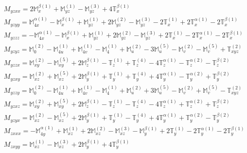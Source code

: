 \documentclass[fleqn,8pt,landscape]{jsarticle}
\begin{document}
\begin{align*}
& M_{yzxx} = 2 \mathbb{M}_{x}^{\beta(1)} + \mathbb{M}_{yz}^{(1)} - \mathbb{M}_{yz}^{(3)} + 4 \mathbb{T}_{x}^{\beta(1)} \\
& M_{yzyy} = \mathbb{M}_{4x}^{\alpha(1)} - \mathbb{M}_{x}^{\beta(1)} + \mathbb{M}_{yz}^{(1)} + 2 \mathbb{M}_{yz}^{(2)} - \mathbb{M}_{yz}^{(3)} - 2 \mathbb{T}_{x}^{(1)} + 2 \mathbb{T}_{x}^{\alpha(1)} - 2 \mathbb{T}_{x}^{\beta(1)} \\
& M_{yzzz} = - \mathbb{M}_{4x}^{\alpha(1)} - \mathbb{M}_{x}^{\beta(1)} + \mathbb{M}_{yz}^{(1)} + 2 \mathbb{M}_{yz}^{(2)} - \mathbb{M}_{yz}^{(3)} + 2 \mathbb{T}_{x}^{(1)} - 2 \mathbb{T}_{x}^{\alpha(1)} - 2 \mathbb{T}_{x}^{\beta(1)} \\
& M_{yzyz} = \mathbb{M}_{0}^{(2)} - \mathbb{M}_{4u}^{(1)} + \mathbb{M}_{4v}^{(1)} - \mathbb{M}_{4}^{(1)} + \mathbb{M}_{u}^{(2)} - 3 \mathbb{M}_{u}^{(5)} - \mathbb{M}_{v}^{(2)} - \mathbb{M}_{v}^{(5)} + \mathbb{T}_{xyz}^{(2)} \\
& M_{yzzx} = \mathbb{M}_{xy}^{(2)} - \mathbb{M}_{xy}^{(5)} + 2 \mathbb{M}_{z}^{\beta(1)} - \mathbb{T}_{z}^{(1)} + \mathbb{T}_{z}^{(4)} - 4 \mathbb{T}_{z}^{\alpha(1)} - \mathbb{T}_{z}^{\alpha(2)} - \mathbb{T}_{z}^{\beta(2)} \\
& M_{yzxy} = \mathbb{M}_{xz}^{(2)} + \mathbb{M}_{xz}^{(5)} + 2 \mathbb{M}_{y}^{\beta(1)} + \mathbb{T}_{y}^{(1)} + \mathbb{T}_{y}^{(4)} + 4 \mathbb{T}_{y}^{\alpha(1)} - \mathbb{T}_{y}^{\alpha(2)} + \mathbb{T}_{y}^{\beta(2)} \\
& M_{yzzy} = \mathbb{M}_{0}^{(2)} - \mathbb{M}_{4u}^{(1)} + \mathbb{M}_{4v}^{(1)} - \mathbb{M}_{4}^{(1)} + \mathbb{M}_{u}^{(2)} + 3 \mathbb{M}_{u}^{(5)} - \mathbb{M}_{v}^{(2)} + \mathbb{M}_{v}^{(5)} - \mathbb{T}_{xyz}^{(2)} \\
& M_{yzxz} = \mathbb{M}_{xy}^{(2)} + \mathbb{M}_{xy}^{(5)} + 2 \mathbb{M}_{z}^{\beta(1)} - \mathbb{T}_{z}^{(1)} - \mathbb{T}_{z}^{(4)} - 4 \mathbb{T}_{z}^{\alpha(1)} + \mathbb{T}_{z}^{\alpha(2)} + \mathbb{T}_{z}^{\beta(2)} \\
& M_{yzyx} = \mathbb{M}_{xz}^{(2)} - \mathbb{M}_{xz}^{(5)} + 2 \mathbb{M}_{y}^{\beta(1)} + \mathbb{T}_{y}^{(1)} - \mathbb{T}_{y}^{(4)} + 4 \mathbb{T}_{y}^{\alpha(1)} + \mathbb{T}_{y}^{\alpha(2)} - \mathbb{T}_{y}^{\beta(2)} \\
& M_{zxxx} = - \mathbb{M}_{4y}^{\alpha(1)} + \mathbb{M}_{xz}^{(1)} + 2 \mathbb{M}_{xz}^{(2)} - \mathbb{M}_{xz}^{(3)} - \mathbb{M}_{y}^{\beta(1)} + 2 \mathbb{T}_{y}^{(1)} - 2 \mathbb{T}_{y}^{\alpha(1)} - 2 \mathbb{T}_{y}^{\beta(1)} \\
& M_{zxyy} = \mathbb{M}_{xz}^{(1)} - \mathbb{M}_{xz}^{(3)} + 2 \mathbb{M}_{y}^{\beta(1)} + 4 \mathbb{T}_{y}^{\beta(1)} \\

\end{align*}
\end{document}
